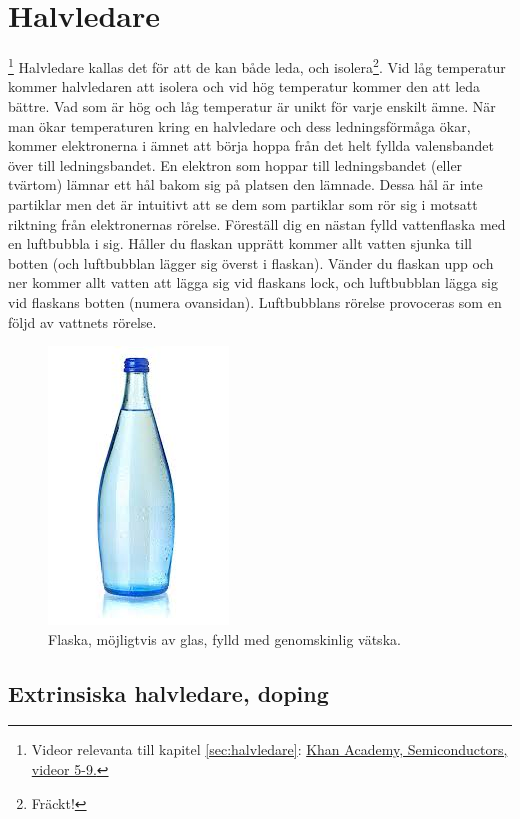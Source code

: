 \section{Halvledare} 

\footnote{Videor relevanta till kapitel \ref{sec:halvledare}: \href{https://www.youtube.com/playlist?list=PL2ub1_oKCn7ogaMtdB2RumlIYqNeXf_oX}{Khan Academy, Semiconductors, videor 5-9.}}
\label{sec:halvledare}
Halvledare kallas det för att de kan både leda, och isolera\footnote{Fräckt!}. Vid låg temperatur kommer halvledaren att isolera och vid hög temperatur kommer den att leda bättre. Vad som är hög och låg temperatur är unikt för varje enskilt ämne. När man ökar temperaturen kring en halvledare och dess ledningsförmåga ökar, kommer elektronerna i ämnet att börja hoppa från det helt fyllda valensbandet över till ledningsbandet. En elektron som hoppar till ledningsbandet (eller tvärtom) lämnar ett hål bakom sig på platsen den lämnade. Dessa hål är inte partiklar men det är intuitivt att se dem som partiklar som rör sig i motsatt riktning från elektronernas rörelse. Föreställ dig en nästan fylld vattenflaska med en luftbubbla i sig. Håller du flaskan upprätt kommer allt vatten sjunka till botten (och luftbubblan lägger sig överst i flaskan). Vänder du flaskan upp och ner kommer allt vatten att lägga sig vid flaskans lock, och luftbubblan lägga sig vid flaskans botten (numera ovansidan). Luftbubblans rörelse provoceras som en följd av vattnets rörelse. 
\begin{figure}[ht]
    \centering
    \includegraphics[scale = 0.3]{bilder/vatten.png}
    \caption{Flaska, möjligtvis av glas, fylld med genomskinlig vätska.}
    \label{fig:vatten}
\end{figure}

\subsection{Extrinsiska halvledare, doping}

